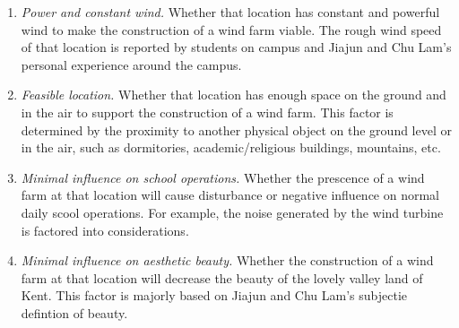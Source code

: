 \documentclass[review]{elsarticle}
\begin{document}
\begin{enumerate}
    \item \emph{Power and constant wind.} Whether that location has constant and powerful wind to make the construction of a wind farm viable. The rough wind speed of that location is reported by students on campus and Jiajun and Chu Lam's personal experience around the campus.
    \item \emph{Feasible location.} Whether that location has enough space on the ground and in the air to support the construction of a wind farm. This factor is determined by the proximity to another physical object on the ground level or in the air, such as dormitories, academic/religious buildings, mountains, etc.
    \item \emph{Minimal influence on school operations.} Whether the prescence of a wind farm at that location will cause disturbance or negative influence on normal daily scool operations. For example, the noise generated by the wind turbine is factored into considerations.
    \item \emph{Minimal influence on aesthetic beauty.} Whether the construction of a wind farm at that location will decrease the beauty of the lovely valley land of Kent. This factor is majorly based on Jiajun and Chu Lam's subjectie defintion of beauty.
\end{enumerate}
\end{document}
